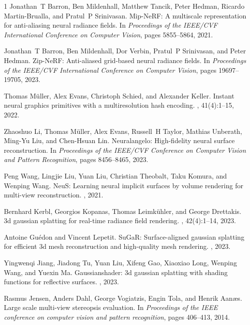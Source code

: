 \begin{thebibliography}{1}
Jonathan~T Barron, Ben Mildenhall, Matthew Tancik, Peter Hedman, Ricardo Martin-Brualla, and Pratul~P Srinivasan.
\newblock Mip-NeRF: A multiscale representation for anti-aliasing neural radiance fields.
\newblock In {\em Proceedings of the IEEE/CVF International Conference on Computer Vision}, pages 5855--5864, 2021.

Jonathan~T Barron, Ben Mildenhall, Dor Verbin, Pratul~P Srinivasan, and Peter Hedman.
\newblock Zip-NeRF: Anti-aliased grid-based neural radiance fields.
\newblock In {\em Proceedings of the IEEE/CVF International Conference on Computer Vision}, pages 19697--19705, 2023.

Thomas M{\"u}ller, Alex Evans, Christoph Schied, and Alexander Keller.
\newblock Instant neural graphics primitives with a multiresolution hash encoding.
, 41(4):1--15, 2022.

Zhaoshuo Li, Thomas M{\"u}ller, Alex Evans, Russell~H Taylor, Mathias Unberath, Ming-Yu Liu, and Chen-Hsuan Lin.
\newblock Neuralangelo: High-fidelity neural surface reconstruction.
\newblock In {\em Proceedings of the IEEE/CVF Conference on Computer Vision and Pattern Recognition}, pages 8456--8465, 2023.

Peng Wang, Lingjie Liu, Yuan Liu, Christian Theobalt, Taku Komura, and Wenping Wang.
\newblock NeuS: Learning neural implicit surfaces by volume rendering for multi-view reconstruction.
, 2021.

Bernhard Kerbl, Georgios Kopanas, Thomas Leimk{\"u}hler, and George Drettakis.
\newblock 3d gaussian splatting for real-time radiance field rendering.
, 42(4):1--14, 2023.

Antoine Gu{\'e}don and Vincent Lepetit.
\newblock SuGaR: Surface-aligned gaussian splatting for efficient 3d mesh reconstruction and high-quality mesh rendering.
, 2023.

Yingwenqi Jiang, Jiadong Tu, Yuan Liu, Xifeng Gao, Xiaoxiao Long, Wenping Wang, and Yuexin Ma.
\newblock Gaussianshader: 3d gaussian splatting with shading functions for reflective surfaces.
, 2023.

Rasmus Jensen, Anders Dahl, George Vogiatzis, Engin Tola, and Henrik Aan{\ae}s.
\newblock Large scale multi-view stereopsis evaluation.
\newblock In {\em Proceedings of the IEEE conference on computer vision and pattern recognition}, pages 406--413, 2014.


\end{thebibliography}
